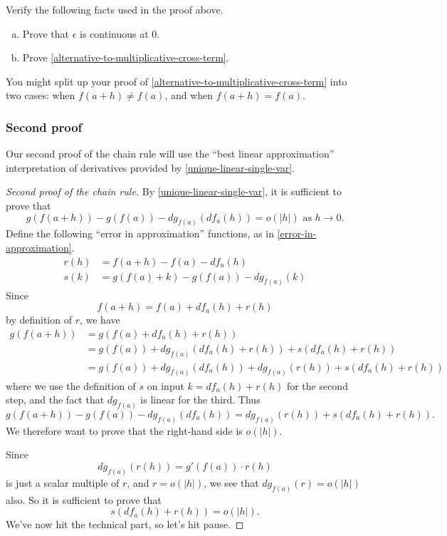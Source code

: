 \begin{exercise} \label{chain-rule-single-first-proof-details}
	Verify the following facts used in the proof above.
	\begin{enumerate}[(a)]
		\item Prove that $\epsilon$ is continuous at 0.
		\item Prove \cref{alternative-to-multiplicative-cross-term}. 
	\end{enumerate}
\begin{hint} You might split up your proof of \cref{alternative-to-multiplicative-cross-term} into two cases: when $f(a+h) \neq f(a)$, and when $f(a+h) = f(a)$. 
\end{hint}
\end{exercise}

\subsubsection*{Second proof}

Our second proof of the chain rule will use the ``best linear approximation'' interpretation of derivatives provided by \cref{unique-linear-single-var}. 

\begin{proof}[Second proof of the chain rule] \renewcommand{\qedsymbol}{}
	By \cref{unique-linear-single-var}, it is sufficient to prove that
	\[ g(f(a+h))-g(f(a))-dg_{f(a)}(df_a(h)) = o(|h|) \text{ as } h \to 0. \]
	Define the following ``error in approximation'' functions, as in \cref{error-in-approximation}. 
	\[ \begin{aligned} 
	r(h) &= f(a+h)-f(a) - df_a(h) \\ 
	s(k) &= g(f(a)+k)-g(f(a))-dg_{f(a)}(k) \end{aligned} \]
	Since
	\[ f(a+h) = f(a) + df_a(h) + r(h) \]
	by definition of $r$, we have
	\[ \begin{aligned}
	g(f(a+h)) &= g(f(a) + df_a(h) + r(h)) \\
	&= g(f(a)) + dg_{f(a)}(df_{a}(h) + r(h)) + s(df_a(h)+r(h)) \\
	&= g(f(a)) + dg_{f(a)}(df_{a}(h)) + dg_{f(a)}(r(h)) +  s(df_a(h) + r(h)) \end{aligned} \]
	where we use the definition of $s$ on input $k = df_a(h)+r(h)$ for the second step, and the fact that $dg_{f(a)}$ is linear for the third. Thus
	\[ g(f(a+h)) - g(f(a)) - dg_{f(a)}(df_a(h)) = dg_{f(a)}(r(h)) + s(df_a(h)+r(h)). \]
	We therefore want to prove that the right-hand side is $o(|h|)$. 	
	
	Since \[ dg_{f(a)}(r(h)) = g'(f(a)) \cdot r(h) \] is just a scalar multiple of $r$, and $r = o(|h|)$, we see that $dg_{f(a)}(r) = o(|h|)$ also. So it is sufficient to prove that
	\[ s(df_a(h)+r(h)) = o(|h|). \]
	We've now hit the technical part, so let's hit pause. 
\end{proof}


